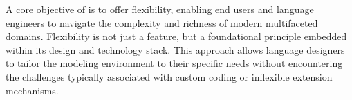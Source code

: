 








A core objective of \jjodel{} is to offer flexibility, enabling end users and language engineers to navigate the complexity and richness of modern multifaceted domains. Flexibility is not just a feature, but a foundational principle embedded within its design and technology stack. This approach allows language designers to tailor the modeling environment to their specific needs without encountering the challenges typically associated with custom coding or inflexible extension mechanisms.

